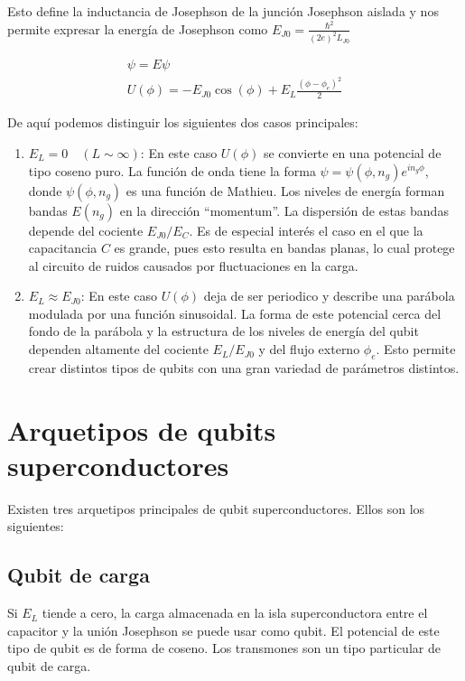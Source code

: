 Esto define la inductancia de Josephson de la junción Josephson aislada y nos permite expresar la energía de Josephson como $E_{J0} = \frac{\hbar^2}{(2e)^2L_{J0}}$

\begin{align}
[E_C (-i\hbar \frac{\partial}{\partial\phi}-n_g)^2 + U(\phi)] \psi = E \psi \\
U(\phi) = -E_{J0} \cos(\phi) + E_L \frac{(\phi-\phi_e)^2}{2}
\end{align}

De aquí podemos distinguir los siguientes dos casos principales:

\begin{enumerate}
    \item $E_L = 0 \quad (L \sim \infty)$: En este caso $U(\phi)$ se convierte en una potencial de tipo coseno puro. La función de onda tiene la forma $\psi = \psi(\phi, n_g) e^{i n_g \phi}$, donde $\psi(\phi, n_g)$ es una función de Mathieu. Los niveles de energía forman bandas $E(n_g)$ en la dirección ``momentum''. La dispersión de estas bandas depende del cociente $E_{J0}/E_C$. Es de especial interés el caso en el que la capacitancia $C$ es grande, pues esto resulta en bandas planas, lo cual protege al circuito de ruidos causados por fluctuaciones en la carga.
    \item $E_L \approx E_{J0}$: En este caso $U(\phi)$ deja de ser periodico y describe una parábola modulada por una función sinusoidal. La forma de este potencial cerca del fondo de la parábola y la estructura de los niveles de energía del qubit dependen altamente del cociente $E_L/E_{J0}$ y del flujo externo $\phi_e$. Esto permite crear distintos tipos de qubits con una gran variedad de parámetros distintos.
\end{enumerate}

\section{Arquetipos de qubits superconductores}

Existen tres arquetipos principales de qubit superconductores. Ellos son los siguientes:

\subsection{Qubit de carga}

Si $E_L$ tiende a cero, la carga almacenada en la isla superconductora entre el capacitor y  la unión Josephson se puede usar como qubit. El potencial de este tipo de qubit es de forma de coseno. Los transmones son un tipo particular de qubit de carga.

